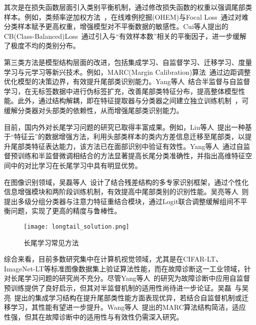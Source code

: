 \documentclass[master]{thesis-uestc}
\begin{document}
其次是在损失函数层面引入类别平衡机制，通过修改损失函数的权重以强调尾部类样本。例如，类频率逆加权方法~，在线难例挖掘(OHEM)与Focal Loss~通过对难分类样本赋予更高权重，增强模型对不平衡数据的敏感性。Cui等人提出的CB(Class-Balanced)Loss~通过引入与“有效样本数”相关的平衡因子，进一步缓解了极度不均的类别分布。

第三类方法是模型结构层面的改进，包括集成学习、自监督学习、迁移学习、度量学习与元学习等新兴技术。例如，MARC(Margin Calibration)算法~通过边距调整优化模型的决策边界，有效提升尾部类识别能力。Yang等人~结合半监督与自监督学习，在无标签数据中进行伪标签扩充，改善尾部类特征分布，提高整体模型性能。此外，通过结构解耦，即在特征提取器与分类器之间建立独立训练机制~，可缓解分类器对头部类的依赖性，从而增强尾部类识别能力。

目前，国内外对长尾学习问题的研究已取得丰富成果。例如，Liu等人~提出一种基于“特征云”的数据增强方法，利用头部类样本的类内方差信息迁移至尾部类，以提升尾部类特征表达能力，该方法已在面部识别中验证有效性。Yang等人~通过自监督预训练和半监督微调相结合的方法显著提高长尾分类准确性，并指出高维特征空间中的对比学习在长尾学习中具有明显优势。

在图像识别领域，吴磊等人~设计了结合残差结构的多专家识别框架，通过个性化信息增强模块和两阶段训练机制，有效提高中尾部类别的识别性能。吴亮等人~则提出多级分组分类器与注意力特征重结合模块，通过Logit联合调整缓解组间不平衡问题，实现了更高的精度与鲁棒性。

\begin{figure}[h]
    \centering
    \texttt{[image: longtail\_solution.png]}
    \caption{长尾学习常见方法}
    \label{longtail_solution}
\end{figure}

综合来看，目前多数研究集中在计算机视觉领域，尤其是在CIFAR-LT、ImageNet-LT等标准图像数据集上验证算法性能，而在故障诊断这一工业领域，针对长尾学习问题的研究尚不充分。尽管Yang等人~的研究为故障诊断中应用自监督预训练提供了良好启示，但其对半监督机制的适用性尚待进一步论证。吴磊~与吴亮~提出的集成学习结构在提升尾部类性能方面表现优异，若结合自监督机制或迁移学习，其性能有望进一步提升。Wang等人~提出的MARC算法结构简洁，适应性强，但其在故障诊断中的适用性与有效性仍需深入研究。
\end{document}
